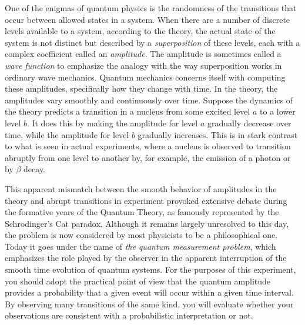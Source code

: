 \documentclass{revtex4}
\begin{document}
One of the enigmas of quantum physics is the randomness of the transitions
that occur between allowed states in a system.  When there are a number of
discrete levels available to a system, according to the theory, the actual
state of the system is not distinct but described by a {\em superposition}
of these levels, each with a complex coefficient called an {\em amplitude}.
The amplitude is sometimes called a {\em wave function} to emphasize the
analogy with the way superposition works in ordinary wave mechanics.  Quantum
mechanics concerns itself with computing these amplitudes, specifically how
they change with time.  In the theory, the amplitudes vary smoothly and
continuously over time.  Suppose the dynamics of the theory predicts a
transition in a nucleus from some excited level $a$ to a lower level $b$.
It does this by making the amplitude for level $a$ gradually decrease
over time, while the amplitude for level $b$ gradually increases.  This is
in stark contrast to what is seen in actual experiments, where a nucleus
is observed to transition abruptly from one level to another by, for example,
the emission of a photon or by $\beta$ decay.

This apparent mismatch between the smooth behavior of amplitudes in the
theory and abrupt transitions in experiment provoked extensive debate
during the formative years of the Quantum Theory, as famously represented
by the Schrodinger's Cat paradox.  Although it remains largely unresolved
to this day, the problem is now considered by most physicists to be a
philosophical one.  Today it goes under the name of {\em the quantum
measurement problem}, which emphasizes the role played by the observer
in the apparent interruption of the smooth time evolution of quantum systems.
For the purposes of this experiment, you should adopt the practical point
of view that the quantum amplitude provides a probability that a given event
will occur within a given time interval.  By observing many transitions of
the same kind, you will evaluate whether your observations are consistent
with a probabilistic interpretation or not.
\end{document}
